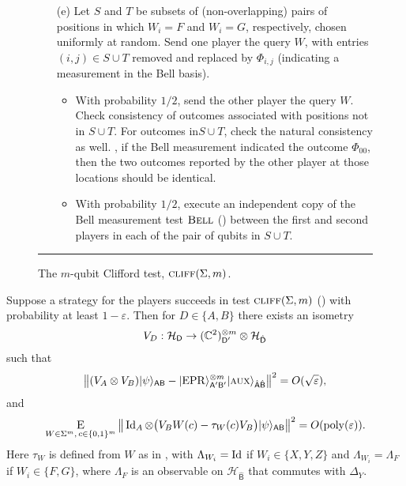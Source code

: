 \documentclass{toc}
\newcommand{\ket}[1]{|#1\rangle}
\newcommand{\Id}{\ensuremath{\mathop{\rm Id}\nolimits}}
\newcommand{\Es}[1]{\ensuremath{\mathop{\textsc{E}}}_{#1}} %
\DeclareMathOperator{\poly}{poly}
\newcommand{\reg}[1]{{\textsf{#1}}}
\newcommand{\mH}{\mathcal{H}}
\newcommand{\eps}{\varepsilon}
\newcommand{\EPR}{{\rm EPR}}
\newcommand{\aux}{\textsc {aux}}
\newcommand{\bellt}{\textsc{Bell}}
\newcommand{\cliff}{\textsc{cliff}}
\newcommand{\phase}{\Lambda}
\begin{document}
\begin{figure}[H]
\begin{itemize}
\begin{enumerate}
\item[(e)] Let $S$ and $T$ be subsets of (non-overlapping) pairs of positions in which $W_i=F$ and $W_i=G$, %
 respectively, chosen uniformly at random. Send one player the query $W$, with entries $(i,j) \in S\cup T$ removed and replaced by $\Phi_{i,j}$ (indicating a measurement in the Bell basis). 
\begin{itemize}
\item With probability $1/2$, send the other player the query $W$. Check consistency of outcomes associated with positions not in $S\cup T$. For outcomes in$S\cup T$, check the natural consistency as 
well. \Eg,
if the Bell measurement indicated the outcome $\Phi_{00}$, then the two outcomes reported by the other player at those locations should be identical. 
\item With probability $1/2$, execute an independent copy of the Bell measurement test $\bellt$ () between the first and second players in each of the pair of qubits in $S\cup T$. 
\end{itemize}
\end{enumerate}
\end{itemize}
\rule[2ex]{\textwidth}{0.5pt}\vspace{-.5cm}
\caption{The $m$-qubit Clifford test, $\cliff(\Sigma,m)$.}
\label{fig:clifford-test-3}
\end{figure}

\newpage  %

\begin{theorem}\label{thm:clifford-ntest}
Suppose a strategy for the players succeeds in test $\cliff(\Sigma,m)$ () with probability at least $1-\eps$. Then  for $D\in\{A,B\}$ there exists an isometry 
$$V_D: \mathcal{H}_\reg{D} \to (\C^2)^{\otimes m}_{\reg{D}'} \otimes {\mH}_{\hat{\reg{D}}}$$
such that 
\begin{equation}\label{eq:psi-epr}
\big\| (V_A \otimes V_B) \ket{\psi}_{\reg{AB}} - \ket{\EPR}_{\reg{A}'\reg{B}'}^{\otimes m} \ket{\aux}_{\hat{\reg{A}}\hat{\reg{B}}} \big\|^2 = O(\sqrt{\eps}),
\end{equation}
and \begin{equation}\label{eq:clifford-ntest-close}
\Es{W\in\Sigma^m,\,c\in\{0,1\}^m} \big\| \Id_A \otimes \big( V_B W(c) - \tau_{W}(c) V_B\big)   \ket{\psi}_{\reg{AB}} \big\|^2 = O(\poly(\eps)).
\end{equation}
Here $\tau_W$ is defined from $W$ as in , with $\phase_{W_i} = \Id$ if $W_i\in \{X,Y,Z\}$ and $\phase_{W_i} = \phase_F$ if $W_i\in\{F,G\}$, where $\phase_F$ is an  observable on ${\mH}_{\hat{\reg{B}}}$ that commutes with $\Delta_Y$. 
\end{theorem}
\end{document}
